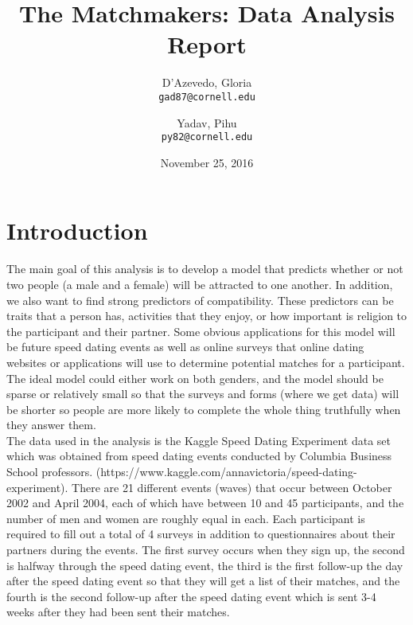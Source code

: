 \documentclass{article}
\title{The Matchmakers: Data Analysis Report}
\author{
  D'Azevedo, Gloria\\
  \texttt{gad87@cornell.edu}
  \and
  Yadav, Pihu\\
  \texttt{py82@cornell.edu}
}
\date{November 25, 2016}
\begin{document}
\maketitle



\section{Introduction}
The main goal of this analysis is to develop a model that predicts whether or not two people (a male and a female) will be attracted to one another.  In addition, we also want to find strong predictors of compatibility.  These predictors can be traits that a person has, activities that they enjoy, or how important is religion to the participant and their partner.  Some obvious applications for this model will be future speed dating events as well as online surveys that online dating websites or applications will use to determine potential matches for a participant. The ideal model could either work on both genders, and the model should be sparse or relatively small so that the surveys and forms (where we get data) will be shorter so people are more likely to complete the whole thing truthfully when they answer them.\\

The data used in the analysis is the Kaggle Speed Dating Experiment data set which was obtained from speed dating events conducted by Columbia Business School professors.  (https://www.kaggle.com/annavictoria/speed-dating-experiment). There are 21 different events (waves) that occur between October 2002 and April 2004, each of which have between 10 and 45 participants, and the number of men and women are roughly equal in each.  Each participant is required to fill out a total of 4 surveys in addition to questionnaires about their partners during the events.  The first survey occurs when they sign up, the second is halfway through the speed dating event, the third is the first follow-up the day after the speed dating event so that they will get a list of their matches, and the fourth is the second follow-up after the speed dating event which is sent 3-4 weeks after they had been sent their matches. \\
\end{document}

